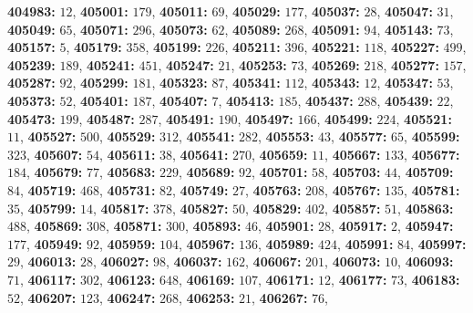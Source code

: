 \textsf{\bfseries 404983:} $12$, \textsf{\bfseries 405001:} $179$, \textsf{\bfseries 405011:} $69$, \textsf{\bfseries 405029:} $177$, \textsf{\bfseries 405037:} $28$, \textsf{\bfseries 405047:} $31$, \textsf{\bfseries 405049:} $65$, \textsf{\bfseries 405071:} $296$, \textsf{\bfseries 405073:} $62$, \textsf{\bfseries 405089:} $268$, \textsf{\bfseries 405091:} $94$, \textsf{\bfseries 405143:} $73$, \textsf{\bfseries 405157:} $5$, \textsf{\bfseries 405179:} $358$, \textsf{\bfseries 405199:} $226$, \textsf{\bfseries 405211:} $396$, \textsf{\bfseries 405221:} $118$, \textsf{\bfseries 405227:} $499$, \textsf{\bfseries 405239:} $189$, \textsf{\bfseries 405241:} $451$, \textsf{\bfseries 405247:} $21$, \textsf{\bfseries 405253:} $73$, \textsf{\bfseries 405269:} $218$, \textsf{\bfseries 405277:} $157$, \textsf{\bfseries 405287:} $92$, \textsf{\bfseries 405299:} $181$, \textsf{\bfseries 405323:} $87$, \textsf{\bfseries 405341:} $112$, \textsf{\bfseries 405343:} $12$, \textsf{\bfseries 405347:} $53$, \textsf{\bfseries 405373:} $52$, \textsf{\bfseries 405401:} $187$, \textsf{\bfseries 405407:} $7$, \textsf{\bfseries 405413:} $185$, \textsf{\bfseries 405437:} $288$, \textsf{\bfseries 405439:} $22$, \textsf{\bfseries 405473:} $199$, \textsf{\bfseries 405487:} $287$, \textsf{\bfseries 405491:} $190$, \textsf{\bfseries 405497:} $166$, \textsf{\bfseries 405499:} $224$, \textsf{\bfseries 405521:} $11$, \textsf{\bfseries 405527:} $500$, \textsf{\bfseries 405529:} $312$, \textsf{\bfseries 405541:} $282$, \textsf{\bfseries 405553:} $43$, \textsf{\bfseries 405577:} $65$, \textsf{\bfseries 405599:} $323$, \textsf{\bfseries 405607:} $54$, \textsf{\bfseries 405611:} $38$, \textsf{\bfseries 405641:} $270$, \textsf{\bfseries 405659:} $11$, \textsf{\bfseries 405667:} $133$, \textsf{\bfseries 405677:} $184$, \textsf{\bfseries 405679:} $77$, \textsf{\bfseries 405683:} $229$, \textsf{\bfseries 405689:} $92$, \textsf{\bfseries 405701:} $58$, \textsf{\bfseries 405703:} $44$, \textsf{\bfseries 405709:} $84$, \textsf{\bfseries 405719:} $468$, \textsf{\bfseries 405731:} $82$, \textsf{\bfseries 405749:} $27$, \textsf{\bfseries 405763:} $208$, \textsf{\bfseries 405767:} $135$, \textsf{\bfseries 405781:} $35$, \textsf{\bfseries 405799:} $14$, \textsf{\bfseries 405817:} $378$, \textsf{\bfseries 405827:} $50$, \textsf{\bfseries 405829:} $402$, \textsf{\bfseries 405857:} $51$, \textsf{\bfseries 405863:} $488$, \textsf{\bfseries 405869:} $308$, \textsf{\bfseries 405871:} $300$, \textsf{\bfseries 405893:} $46$, \textsf{\bfseries 405901:} $28$, \textsf{\bfseries 405917:} $2$, \textsf{\bfseries 405947:} $177$, \textsf{\bfseries 405949:} $92$, \textsf{\bfseries 405959:} $104$, \textsf{\bfseries 405967:} $136$, \textsf{\bfseries 405989:} $424$, \textsf{\bfseries 405991:} $84$, \textsf{\bfseries 405997:} $29$, \textsf{\bfseries 406013:} $28$, \textsf{\bfseries 406027:} $98$, \textsf{\bfseries 406037:} $162$, \textsf{\bfseries 406067:} $201$, \textsf{\bfseries 406073:} $10$, \textsf{\bfseries 406093:} $71$, \textsf{\bfseries 406117:} $302$, \textsf{\bfseries 406123:} $648$, \textsf{\bfseries 406169:} $107$, \textsf{\bfseries 406171:} $12$, \textsf{\bfseries 406177:} $73$, \textsf{\bfseries 406183:} $52$, \textsf{\bfseries 406207:} $123$, \textsf{\bfseries 406247:} $268$, \textsf{\bfseries 406253:} $21$, \textsf{\bfseries 406267:} $76$, 
